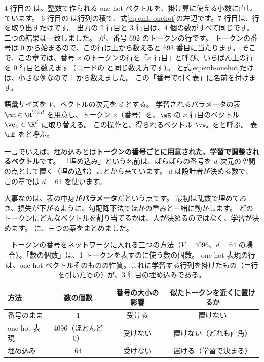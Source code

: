 
4 行目の  は、整数で作られる one-hot ベクトルを、掛け算に使える小数に直しています。
6 行目の  は行列の積で、式\eqref{eq:emb-onehot}の左辺です。7 行目は、行を取り出すだけです。
出力の 2 行目と 3 行目は、4 個の数がすべて同じです。
二つの結果は一致しました。
 が、番号 692 のトークンの行です。
トークンの番号は 0 から始まるので、この行は上から数えると 693 番目に当たります。
そこで、この章では、番号 $x$ のトークンの行を「$x$ 行目」と呼び、いちばん上の行を 0 行目と数えます（コードの  と同じ数え方です）。
と式\eqref{eq:emb-onehot}だけは、小さな例なので 1 から数えました。
この「番号で引く表」に名前を付けます。

\begin{definition}[埋め込み]\label{def:emb-embedding}
語彙サイズを $V$、ベクトルの次元を $d$ とする。
学習されるパラメータの表 $\mE\in\R^{V\times d}$ を用意し、トークン $x$（番号）を、$\mE$ の $x$ 行目のベクトル $\ve_x\in\R^{d}$ に取り替える。
この操作と、得られるベクトル $\ve_x$ をと呼ぶ。
表 $\mE$ をと呼ぶ。
\end{definition}

一言でいえば、埋め込みとは\textbf{トークンの番号ごとに用意された、学習で調整されるベクトル}です。
「埋め込み」という名前は、ばらばらの番号を $d$ 次元の空間の点として置く（埋め込む）ことから来ています。
$d$ は設計者が決める数で、この章では $d=64$ を使います。

大事なのは、表の中身が\textbf{パラメータ}だという点です。
最初は乱数で埋めておき、損失が下がるように、勾配降下法でほかの重みと一緒に動かします。
どのトークンにどんなベクトルを割り当てるかは、人が決めるのではなく、学習が決めます。
に、三つの案をまとめました。

\begin{table}[tbp]
\centering
\caption{トークンの番号をネットワークに入れる三つの方法（$V=4096$、$d=64$ の場合）。「数の個数」は、1 トークンを表すのに使う数の個数。
one-hot 表現の行は、one-hot ベクトルそのものの性質。これに学習する行列を掛けたもの（＝行を引いたもの）が、3 行目の埋め込みである。}
\label{tab:emb-ways}
\small
\begin{tabular}{lccc}
\toprule
方法 & 数の個数 & 番号の大小の影響 & 似たトークンを近くに置けるか \\
\midrule
番号のまま & 1 & 受ける & 置けない \\
one-hot 表現 & 4096（ほとんど 0） & 受けない & 置けない（どれも直角） \\
埋め込み & 64 & 受けない & 置ける（学習で決まる） \\
\bottomrule
\end{tabular}
\end{table}

